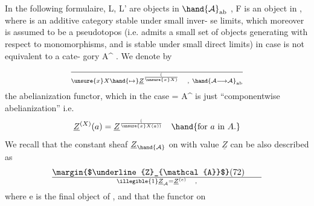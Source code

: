 In the following formulaire, L, L' are objects in $\hand{\mathcal{A}}_{\mathrm{ab}}$ , F is an
object in , where  is an additive category stable under small inver-%
\margin{$\times$}se limits, which moreover is assumed to be a pseudotopos (i.e. admits
a small set of objects generating with respect to monomorphisms, and is
stable under small direct limits) in case   is not equivalent to a cate-%
gory A\^{} . We denote by 
\[
\over{\unsure{x}}{X}\hand{\mapsto}\underline{Z}^{(\over{\unsure{x}}{X})} \quad , \ \hand{\mathcal{A}\longrightarrow\mathcal{A}}_{\mathrm{ab}}
\]
the abelianization functor, which in  the case   = A\^{} is just
``componentwise abelianization'' i.e.
\[
\underline{Z}^{(X)}(a) = \underline{Z}^{(\over{\unsure{x}}{X}(a))} \quad \hand{\text{for }a\text{ in }A.}
\]
We recall that the constant sheaf $\underline{Z}_{\hand{\mathcal{A}}}$ on  with value $\underline{Z}$ can be also
described as
\[
\margin{$\underline{Z}_{\mathcal{A}}$}(72)\qquad \over{\illegible{1}}{\underline{Z}_{\mathcal{A}}} = \underline{Z}^{(e)} \quad ,
\]
where e is the final object of  , and that the \hand{\uline{\textcolor{black}{sections}}} functor on 

